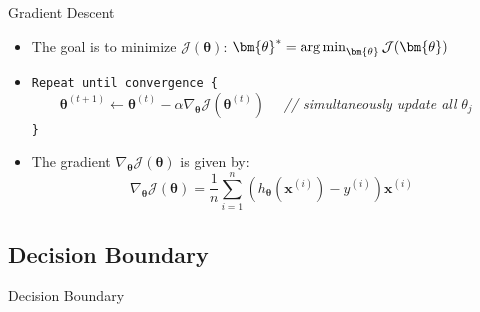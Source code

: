 \begin{frame}{Gradient Descent}{}\important
	\begin{itemize}
		\item The goal is to minimize $\mathcal{J}(\bm{\theta})$: $\bm{\theta}^*
			= \argmin_{\bm{\theta}} \mathcal{J}(\bm{\theta})$
		\item \texttt{Repeat until convergence \{} \\
			$\qquad \bm{\theta}^{(t+1)} \longleftarrow \bm{\theta}^{(t)} - \alpha \nabla_{\bm{\theta}}
				\mathcal{J}(\bm{\theta}^{(t)}) \quad$
			\textcolor{myblue1}{\textit{// simultaneously update all} $\theta_j$} \\
		\texttt{\}}
		\item The gradient $\nabla_{\bm{\theta}} \mathcal{J}(\bm{\theta})$ is given by:
		{\footnotesize
		\begin{equation}
			\nabla_{\bm{\theta}} \mathcal{J}(\bm{\theta}) = \frac{1}{n} \sum_{i=1}^n \left(
				h_{\bm{\theta}}(\bm{x}^{(i)}) - y^{(i)}
			\right) \bm{x}^{(i)}
		\end{equation}}
	\end{itemize}
	\vspace*{-3mm}
	\begin{boxBlueNoFrame}
	\end{boxBlueNoFrame}
\end{frame}


\subsection{Decision Boundary}

\begin{frame}{Decision Boundary}{}
\end{frame}


